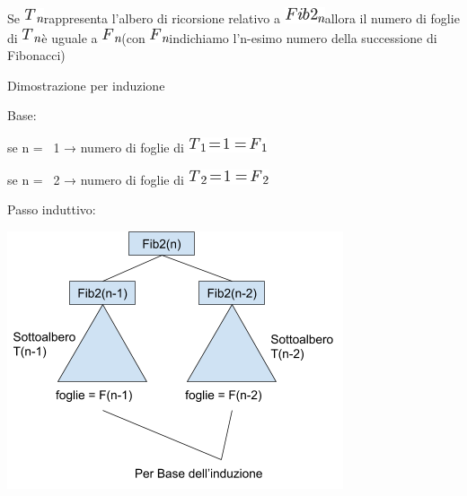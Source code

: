 \documentclass{article}
\begin{document}
{Se }\includegraphics{images/image23.png}{rappresenta l'albero di
ricorsione relativo a }\includegraphics{images/image34.png}{allora il
numero di foglie di }\includegraphics{images/image23.png}{è uguale a
}\includegraphics{images/image1.png}{(con
}\includegraphics{images/image1.png}{indichiamo l'n-esimo numero della
successione di Fibonacci)}

{}

{Dimostrazione per induzione}

{}

{Base:}

{se n = ~1 → numero di foglie di }\includegraphics{images/image35.png}

{se n = ~2 → numero di foglie di }\includegraphics{images/image36.png}

{}

{Passo induttivo:}

{\includegraphics{images/image528.png}}

{~~~~~~~~}
\end{document}
